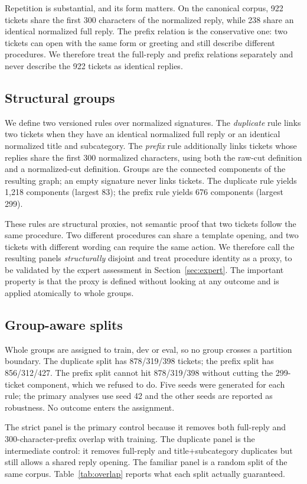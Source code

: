 \documentclass{ieeeaccess}
\begin{document}
Repetition is substantial, and its form matters. On the canonical corpus, 922
tickets share the first 300 characters of the normalized reply, while 238 share an
identical normalized full reply. The prefix relation is the conservative one: two tickets can open with the
same form or greeting and still describe different procedures. We therefore treat
the full-reply and prefix relations separately and never describe the 922 tickets
as identical replies.

\subsection{Structural groups}
We define two versioned rules over normalized signatures. The \emph{duplicate}
rule links two tickets when they have an identical normalized full reply or an
identical normalized title and subcategory. The \emph{prefix} rule additionally
links tickets whose replies share the first 300 normalized characters, using both
the raw-cut definition and a normalized-cut definition. Groups are the
connected components of the resulting graph; an empty signature never links
tickets. The duplicate rule yields 1,218 components (largest 83); the prefix rule
yields 676 components (largest 299).

These rules are structural proxies, not semantic proof that two tickets follow the
same procedure. Two different procedures can share a template opening, and two
tickets with different wording can require the same action. We therefore call the
resulting panels \emph{structurally} disjoint and treat procedure identity as a
proxy, to be validated by the expert assessment in Section~\ref{sec:expert}. The
important property is that the proxy is defined without looking at any outcome and
is applied atomically to whole groups.

\subsection{Group-aware splits}
Whole groups are assigned to train, dev or eval, so no group crosses a partition
boundary. The duplicate split has 878/319/398 tickets; the prefix split has
856/312/427. The prefix split cannot hit 878/319/398 without cutting the
299-ticket component, which we refused to do. Five seeds were generated for each
rule; the primary analyses use seed 42 and the other seeds are reported as
robustness. No outcome enters the assignment.

The strict panel is the primary control because it removes both full-reply and
300-character-prefix overlap with training. The duplicate panel is the intermediate
control: it removes full-reply and title+subcategory duplicates but still allows a
shared reply opening. The familiar panel is a random split of the same corpus. Table~\ref{tab:overlap} reports what each split actually guaranteed.
\end{document}
